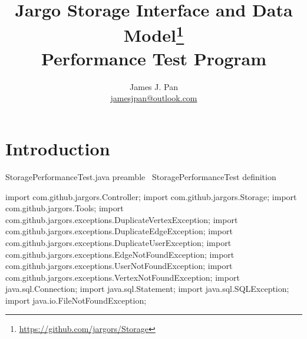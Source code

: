 \documentclass{article}
\title{Jargo Storage Interface
  and Data Model\footnote{\url{https://github.com/jargors/Storage}}\\
  \vspace{.5em}
  \Large{\textbf{Performance Test Program}}}
\author{James J. Pan\\
  \small{\href{mailto:jamesjpan@outlook.com}{jamesjpan@outlook.com}}
}
\def\nwendcode{\endtrivlist \endgroup}
\let\nwdocspar=\par
\begin{document}
\maketitle
\pagestyle{noweb}


\tableofcontents

\section{Introduction}
\label{sec:introduction}
\endmoddef{}
\LA{}StoragePerformanceTest.java preamble~{\nwtagstyle{}}\RA{}
\LA{}\code{}StoragePerformanceTest\edoc{} definition~{\nwtagstyle{}}\RA{}
\nwendcode{}\nwdocspar

\nwenddocs{}\endmoddef{}
import com.github.jargors.Controller;
import com.github.jargors.Storage;
import com.github.jargors.Tools;
import com.github.jargors.exceptions.DuplicateVertexException;
import com.github.jargors.exceptions.DuplicateEdgeException;
import com.github.jargors.exceptions.DuplicateUserException;
import com.github.jargors.exceptions.EdgeNotFoundException;
import com.github.jargors.exceptions.UserNotFoundException;
import com.github.jargors.exceptions.VertexNotFoundException;
import java.sql.Connection;
import java.sql.Statement;
import java.sql.SQLException;
import java.io.FileNotFoundException;
\nwendcode{}\nwdocspar
\end{document}
